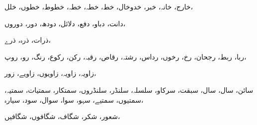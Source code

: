                                                                         خارج،            خانہ،            خبر،            خدوخال،            خط،            خطہ،            خطہ،            خطوط،            خطوں،            خلل،
                                                                        
                                                                                    دانت،            دباو،            دفع،            دلائل،            دودھ،            دور،            دوروں،
                                                                                    
                                                                                                ذرات،            ذرہ،            ذرے،            
                                                                                                
                                                                                                ربا،            ربط،            رجحان،            رخ،            رخوں،            رداس،            رشتہ،            رقاص،            رقبہ،            رکن،            رکوع،            رنگ،            رو،            روپ،
                                                                                                
                                                                                                            زاویہ،            زاویہ،            زاویوں،            زاویے،            زور،            
                                                                                                            
                                                                                                            سائن،            سال،            سال،            سبقت،            سرکاو،            سلسلہ،            سلنڈر،            سلنڈروں،            سمتکار،            سمتیات،            سمتیہ،            سمتیوں،            سمتیے،            سہو،            سوا،            سوال،            سود،            سیارہ،            
                                                                                                            
                                                                                                            شعور،            شکر،            شگاف،            شگافوں،            شگافیں،            
                                                                                                            
